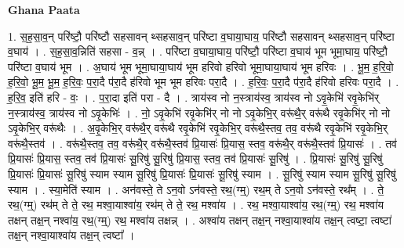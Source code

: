 \documentclass[17pt]{extarticle}
\begin{document}
\textbf{Ghana Paata } \newline

1. स॒ह॒सा॒व॒न् परि॑ष्टौ॒ परि॑ष्टौ सहसावन् थ्सहसाव॒न् परि॑ष्टा व॒घाया॒घाय॒ परि॑ष्टौ सहसावन् थ्सहसाव॒न् परि॑ष्टा व॒घाय॑ । . स॒ह॒सा॒व॒न्निति॑ सहसा - व॒न्न् । . परि॑ष्टा व॒घाया॒घाय॒ परि॑ष्टौ॒ परि॑ष्टा व॒घाय॑ भूम भूमा॒घाय॒ परि॑ष्टौ॒ परि॑ष्टा व॒घाय॑ भूम । . अ॒घाय॑ भूम भूमा॒घाया॒घाय॑ भूम हरिवो हरिवो भूमा॒घाया॒घाय॑ भूम हरिवः । . भू॒म॒ ह॒रि॒वो॒ ह॒रि॒वो॒ भू॒म॒ भू॒म॒ ह॒रि॒वः॒ प॒रा॒दै प॑रा॒दै ह॑रिवो भूम भूम हरिवः परा॒दै । . ह॒रि॒वः॒ प॒रा॒दै प॑रा॒दै ह॑रिवो हरिवः परा॒दै । . ह॒रि॒व॒ इति॑ हरि - वः॒ । . प॒रा॒दा इति॑ परा - दै । . त्राय॑स्व नो न॒स्त्राय॑स्व॒ त्राय॑स्व नो ऽवृ॒केभि॑ रवृ॒केभि॑र् न॒स्त्राय॑स्व॒ त्राय॑स्व नो ऽवृ॒केभिः॑ । . नो॒ ऽवृ॒केभि॑ रवृ॒केभि॑र् नो नो ऽवृ॒केभि॒र् वरू॑थै॒र् वरू॑थै रवृ॒केभि॑र् नो नो ऽवृ॒केभि॒र् वरू॑थैः । . अ॒वृ॒केभि॒र् वरू॑थै॒र् वरू॑थै रवृ॒केभि॑ रवृ॒केभि॒र् वरू॑थै॒स्तव॒ तव॒ वरू॑थै रवृ॒केभि॑ रवृ॒केभि॒र् वरू॑थै॒स्तव॑ । . वरू॑थै॒स्तव॒ तव॒ वरू॑थै॒र् वरू॑थै॒स्तव॑ प्रि॒यासः॑ प्रि॒यास॒ स्तव॒ वरू॑थै॒र् वरू॑थै॒स्तव॑ प्रि॒यासः॑ । . तव॑ प्रि॒यासः॑ प्रि॒यास॒ स्तव॒ तव॑ प्रि॒यासः॑ सू॒रिषु॑ सू॒रिषु॑ प्रि॒यास॒ स्तव॒ तव॑ प्रि॒यासः॑ सू॒रिषु॑ । . प्रि॒यासः॑ सू॒रिषु॑ सू॒रिषु॑ प्रि॒यासः॑ प्रि॒यासः॑ सू॒रिषु॑ स्याम स्याम सू॒रिषु॑ प्रि॒यासः॑ प्रि॒यासः॑ सू॒रिषु॑ स्याम । . सू॒रिषु॑ स्याम स्याम सू॒रिषु॑ सू॒रिषु॑ स्याम । . स्या॒मेति॑ स्याम । . अन॑वस्ते॒ ते ऽन॒वो ऽन॑वस्ते॒ रथ॒(ग्म्॒) रथ॒म् ते ऽन॒वो ऽन॑वस्ते॒ रथ᳚म् । . ते॒ रथ॒(ग्म्॒) रथ॑म् ते ते॒ रथ॒ मश्वा॒याश्वा॑य॒ रथ॑म् ते ते॒ रथ॒ मश्वा॑य । . रथ॒ मश्वा॒याश्वा॑य॒ रथ॒(ग्म्॒) रथ॒ मश्वा॑य तक्षन् तक्ष॒न् नश्वा॑य॒ रथ॒(ग्म्॒) रथ॒ मश्वा॑य तक्षन्न् । . अश्वा॑य तक्षन् तक्ष॒न् नश्वा॒याश्वा॑य तक्ष॒न् त्वष्टा॒ त्वष्टा॑ तक्ष॒न् नश्वा॒याश्वा॑य तक्ष॒न् त्वष्टा᳚ । \newline
\end{document}
